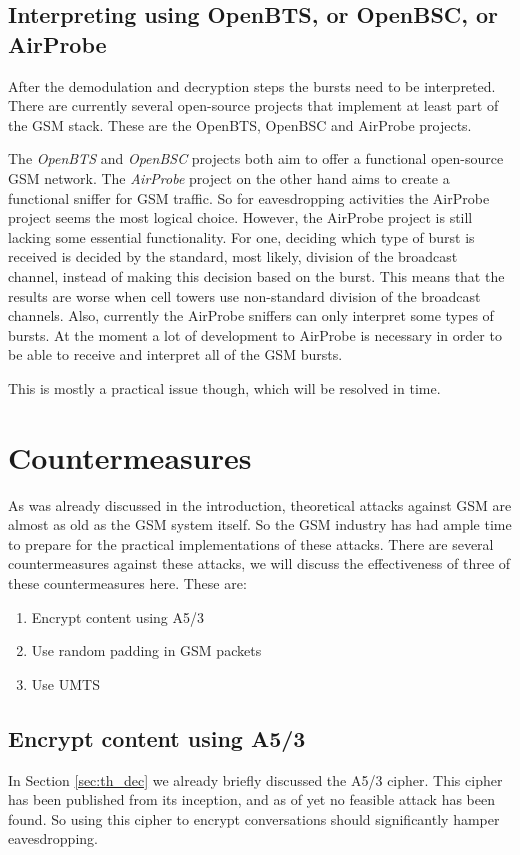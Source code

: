 \documentclass[a4paper,11pt]{llncs}
\begin{document}
\subsection{Interpreting using OpenBTS, or OpenBSC, or AirProbe}\label{sec:prac_int}
After the demodulation and decryption steps the bursts need to be interpreted. 
There are currently several open-source projects that implement at least part of the GSM stack. These are the OpenBTS\cite{url:openbts}, OpenBSC\cite{url:openbsc} and AirProbe\cite{url:airprobe} projects.

The \textit{OpenBTS} and \textit{OpenBSC} projects both aim to offer a functional open-source GSM network. The \textit{AirProbe} project on the other hand aims to create a functional sniffer for GSM traffic. So for eavesdropping activities the AirProbe project seems the most logical choice. However, the AirProbe project is still lacking some essential functionality. For one, deciding which type of burst is received is decided by the standard, most likely, division of the broadcast channel, instead of making this decision based on the burst. This means that the results are worse when cell towers use non-standard division of the broadcast channels. Also, currently the AirProbe sniffers can only interpret some types of bursts.
At the moment a lot of development to AirProbe is necessary in order to be able to receive and interpret all of the GSM bursts.

This is mostly a practical issue though, which will be resolved in time.

\section{Countermeasures}\label{sec:cm}
As was already discussed in the introduction, theoretical attacks against GSM are almost as old as the GSM system itself. So the GSM industry has had ample time to prepare for the practical implementations of these attacks.
There are several countermeasures against these attacks, we will discuss the effectiveness of three of these countermeasures here. These are:
\begin{enumerate}
\item Encrypt content using A5/3
\item Use random padding in GSM packets
\item Use UMTS
\end{enumerate}

\subsection{Encrypt content using A5/3}
In Section \ref{sec:th_dec} we already briefly discussed the A5/3 cipher. This cipher has been published from its inception, and as of yet no feasible attack has been found. So using this cipher to encrypt conversations should significantly hamper eavesdropping. 
\end{document}
